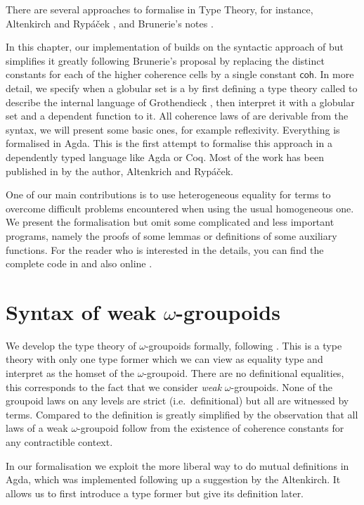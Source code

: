 There are several approaches to formalise {\wog} in Type Theory, for instance, Altenkirch and Ryp\'a\v{c}ek \cite{txa:csl}, and Brunerie's notes \cite{gb:wog}.

In this chapter, our implementation of \wog builds on the syntactic approach of
\cite{txa:csl} but simplifies it greatly following Brunerie's proposal
\cite{gb:wog} by replacing the distinct constants for each of the
higher coherence cells by a single constant $\mathsf{coh}$. In more detail, we
specify when a globular set is a {\wogs} by first defining a type
theory called {\tig} to describe the internal language of Grothendieck
{\wog}, then interpret it with a globular set and a dependent
function to it. All coherence laws of {\wog} are derivable from the
syntax, we will present some basic ones, for example reflexivity. Everything
is formalised in Agda. This is the first attempt to formalise this approach in a
dependently typed language like Agda or Coq. 
Most of the work has been published in \cite{LFMTP14} by the author, Altenkrich and  Ryp\'a\v{c}ek.

One of our main contributions is to use heterogeneous
equality for terms to overcome difficult problems encountered
when using the usual homogeneous one. We present the formalisation but
omit some complicated and less important programs, namely the
proofs of some lemmas or definitions of some auxiliary functions. For the reader who is interested in the details, you can find the complete code in  and also online \cite{lfmtp-github}. 


\section{Syntax of weak {\Large$\omega$}-groupoids}\label{sec:syntax}
%
We develop the type theory of $\omega$-groupoids formally, following
\cite{gb:wog}. This is a type theory with only one type former which
we can view as equality type and interpret as the homset of the
$\omega$-groupoid. There are no definitional equalities, this
corresponds to the fact that we consider \emph{weak} $\omega$-groupoids. None of the groupoid laws on any levels are strict (i.e.\ definitional) but all are witnessed by
terms. Compared to \cite{txa:csl} the definition is greatly
simplified by the observation that all laws of a weak $\omega$-groupoid follow from the existence of coherence constants for
any contractible context.

In our formalisation we exploit the more liberal way to do mutual
definitions in Agda, which was implemented following up a
suggestion by the Altenkirch. It allows us to first introduce a type
former but give its definition later.

